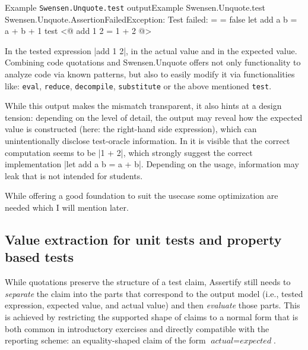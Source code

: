 \begin{outputpanel}{Example \texttt{Swensen.Unquote.test} output}{Example Swensen.Unquote.test}{
Swensen.Unquote.AssertionFailedException: Test failed:\newline\newline
{} = \newline
{} = \newline
false
}
let add a b = a + b + 1
test <@ add 1 2 = 1 + 2 @>
\end{outputpanel}

\noindent In  the tested expression \fsharp|add 1 2|, in
 the actual value and in  the
expected value. Combining code quotations and Swensen.Unquote offers not only
functionality to analyze code via known patterns, but also to easily modify it
via functionalities like: \texttt{eval}, \texttt{reduce}, \texttt{decompile},
\texttt{substitute} or the above mentioned \texttt{test}.
\cite{FsExpr, SwenUnqUserGuide}

While this output makes the mismatch transparent, it also hints at a design
tension: depending on the level of detail, the output may reveal how the
expected value is constructed (here: the right-hand side expression), which can
unintentionally disclose test-oracle information. In 
it is visible that the correct computation seems to be \fsharp|1 + 2|, which
strongly suggest the correct implementation \fsharp|let add a b = a + b|.
Depending on the usage, information may leak that is not intended for students.

\skipM While offering a good foundation to suit the usecase some optimization
are needed which I will mention later.


\subsection{Value extraction for unit tests and property based tests} %
\label{ssctn:value-extraction-for-unit-tests-and-property-based-tests} %


While quotations preserve the structure of a test claim, Assertify still needs
to \emph{separate} the claim into the parts that correspond to the output model
(i.e., tested expression, expected value, and actual value) and then
\emph{evaluate} those parts. This is achieved by restricting the supported
shape of claims to a normal form that is both common in introductory exercises
and directly compatible with the reporting scheme: an equality-shaped claim of
the form $\textit{actual} = \textit{expected}$.

